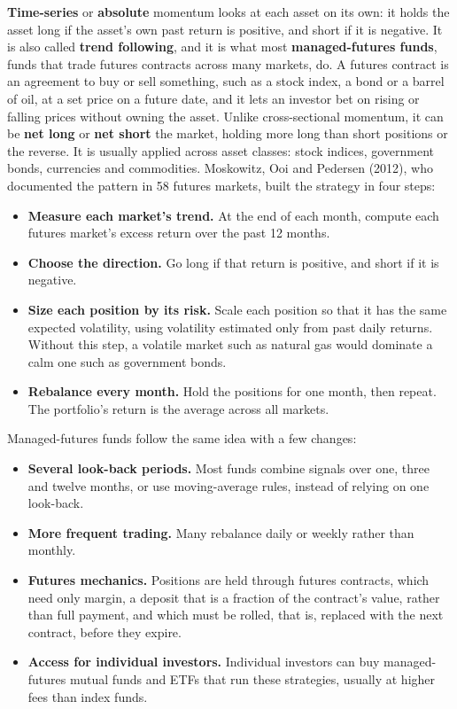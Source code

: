 \textbf{Time-series} or \textbf{absolute} momentum looks at each asset on its own: it holds the asset long if the asset's own past return is positive, and short if it is negative. It is also called \textbf{trend following}, and it is what most \textbf{managed-futures funds}, funds that trade futures contracts across many markets, do. A futures contract is an agreement to buy or sell something, such as a stock index, a bond or a barrel of oil, at a set price on a future date, and it lets an investor bet on rising or falling prices without owning the asset. Unlike cross-sectional momentum, it can be \textbf{net long} or \textbf{net short} the market, holding more long than short positions or the reverse. It is usually applied across asset classes: stock indices, government bonds, currencies and commodities. Moskowitz, Ooi and Pedersen (2012), who documented the pattern in 58 futures markets, built the strategy in four steps:

\begin{itemize}
  \item \textbf{Measure each market's trend.} At the end of each month, compute each futures market's excess return over the past 12 months.
  \item \textbf{Choose the direction.} Go long if that return is positive, and short if it is negative.
  \item \textbf{Size each position by its risk.} Scale each position so that it has the same expected volatility, using volatility estimated only from past daily returns. Without this step, a volatile market such as natural gas would dominate a calm one such as government bonds.
  \item \textbf{Rebalance every month.} Hold the positions for one month, then repeat. The portfolio's return is the average across all markets.
\end{itemize}

Managed-futures funds follow the same idea with a few changes:

\begin{itemize}
  \item \textbf{Several look-back periods.} Most funds combine signals over one, three and twelve months, or use moving-average rules, instead of relying on one look-back.
  \item \textbf{More frequent trading.} Many rebalance daily or weekly rather than monthly.
  \item \textbf{Futures mechanics.} Positions are held through futures contracts, which need only margin, a deposit that is a fraction of the contract's value, rather than full payment, and which must be rolled, that is, replaced with the next contract, before they expire.
  \item \textbf{Access for individual investors.} Individual investors can buy managed-futures mutual funds and ETFs that run these strategies, usually at higher fees than index funds.
\end{itemize}

